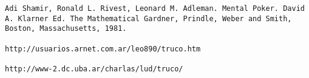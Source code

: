 \begin{verbatim}
Adi Shamir, Ronald L. Rivest, Leonard M. Adleman. Mental Poker. David A. Klarner Ed. The Mathematical Gardner, Prindle, Weber and Smith, Boston, Massachusetts, 1981.

http://usuarios.arnet.com.ar/leo890/truco.htm

http://www-2.dc.uba.ar/charlas/lud/truco/
\end{verbatim}
